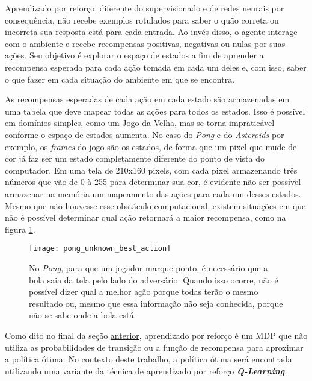 Aprendizado por reforço, diferente do supervisionado e de redes neurais por consequência, não recebe exemplos rotulados para saber o quão correta ou incorreta sua resposta está para cada entrada.
Ao invés disso, o agente interage com o ambiente e recebe recompensas positivas, negativas ou nulas por suas ações.
Seu objetivo é explorar o espaço de estados a fim de aprender a recompensa esperada para cada ação tomada em cada um deles e, com isso, saber o que fazer em cada situação do ambiente em que se encontra.

As recompensas esperadas de cada ação em cada estado são armazenadas em uma tabela que deve mapear todas as ações para todos os estados.
Isso é possível em domínios simples, como um Jogo da Velha, mas se torna impraticável conforme o espaço de estados aumenta.
No caso do \textit{Pong} e do \textit{Asteroids} por exemplo, os \textit{frames} do jogo são os estados, de forma que um pixel que mude de cor já faz ser um estado completamente diferente do ponto de vista do computador.
Em uma tela de 210x160 pixels, com cada pixel armazenando três números que vão de 0 à 255 para determinar sua cor, é evidente não ser possível armazenar na memória um mapeamento das ações para cada um desses estados.
Mesmo que não houvesse esse obstáculo computacional, existem situações em que não é possível determinar qual ação retornará a maior recompensa, como na figura \ref{fig:unknown_best_action}.

\begin{figure}[h!]
  \centering
  \texttt{[image: pong\_unknown\_best\_action]}
  \caption{No \textit{Pong}, para que um jogador marque ponto, é necessário que a bola saia da tela pelo lado do adversário. Quando isso ocorre, não é possível dizer qual a melhor ação porque todas terão o mesmo resultado ou, mesmo que essa informação não seja conhecida, porque não se sabe onde a bola está.}
  \label{fig:unknown_best_action}
\end{figure}

Como dito no final da seção \hyperref[sec:mdp]{anterior}, aprendizado por reforço é um MDP que não utiliza as probabilidades de transição ou a função de recompensa para aproximar a política ótima.
No contexto deste trabalho, a política ótima será encontrada utilizando uma variante da técnica de aprendizado por reforço \textit{\textbf{Q-Learning}}.

